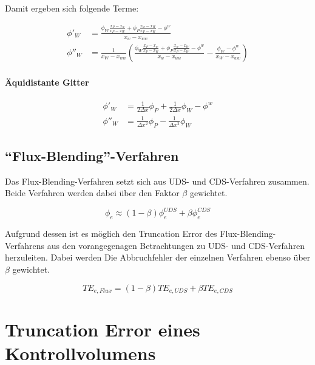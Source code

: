 Damit ergeben sich folgende Terme:

\begin{align}
  \phi'_W &= \frac{\phi_W \frac{x_P-x_w}{x_P-x_W} + \phi_P \frac{x_w-x_W}{x_P-x_W}
-\phi^w}{x_w-x_{ww}}\\
  \phi''_W &= \frac{1}{x_W-x_{ww}} \left({\frac{\phi_W \frac{x_P-x_w}{x_P-x_W} + \phi_P \frac{x_w-x_W}{x_P-x_W}
-\phi^w}{x_w-x_{ww}}
- \frac{\phi_W-\phi^w}{x_W-x_{ww}} }\right)
\end{align}


\paragraph{Äquidistante Gitter}

\begin{align*}
  \phi'_W  &= \frac{1}{2\Delta x} \phi_P + \frac{1}{2\Delta x} \phi_W - \phi^w\\
  \phi''_W &= \frac{1}{\Delta x^2} \phi_P -\frac{1}{\Delta x^2} \phi_W
\end{align*}


\subsection{``Flux-Blending''-Verfahren}

Das Flux-Blending-Verfahren setzt sich aus UDS- und CDS-Verfahren zusammen. Beide
Verfahren werden dabei über den Faktor $\beta$ gewichtet.

\begin{equation*}
\phi_e \approx (1-\beta)\phi_e^{UDS} + \beta \phi_e^{CDS} 
\end{equation*}

Aufgrund dessen ist es möglich den Truncation Error des Flux-Blending-Verfahrens aus
den vorangegenagen Betrachtungen zu UDS- und CDS-Verfahren herzuleiten.
Dabei werden Die Abbruchfehler der einzelnen Verfahren ebenso über $\beta$ gewichtet.

\begin{equation}
  TE_{e, Flux} = (1-\beta) TE_{e, UDS} + \beta TE_{e, CDS}
\end{equation}



\section{Truncation Error eines Kontrollvolumens}
\label{sec:Truncation Error eines Kontrollvolumens}

